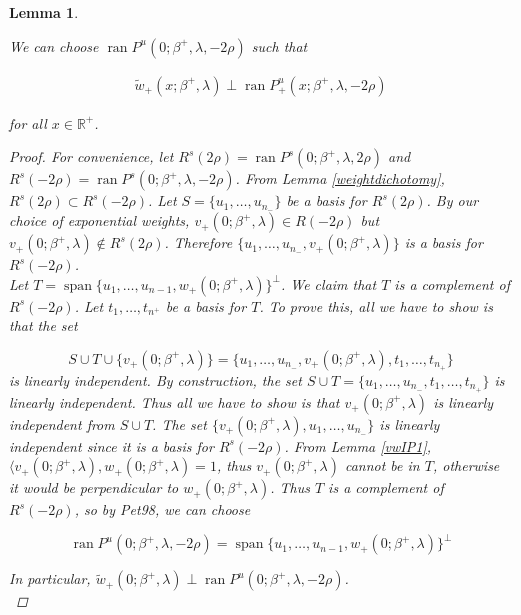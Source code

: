 \documentclass[12pt]{article}
\def\R{{\mathbb R}}
\DeclareMathOperator{\spn}{span}
\DeclareMathOperator{\ran}{ran}
\newtheorem{lemma}{Lemma}
\begin{document}
\begin{lemma}\label{wperpunstable}

We can choose $\ran P^u(0; \beta^+, \lambda, -2 \rho)$ such that 

\begin{align*}
\tilde{w}_+(x; \beta^+, \lambda) \perp \ran P^u_+(x; \beta^+, \lambda, -2 \rho) 
\end{align*}

for all $x \in \R^+$.

\begin{proof}

For convenience, let $R^s(2 \rho) = \ran P^s(0; \beta^+, \lambda, 2 \rho)$ and $R^s(-2 \rho) = \ran P^s(0; \beta^+, \lambda, -2 \rho)$. From Lemma \ref{weightdichotomy}, $R^s(2 \rho) \subset R^s(-2 \rho)$. Let $S = \{ u_1, \dots, u_{n_-} \}$ be a basis for $R^s(2 \rho)$. By our choice of exponential weights, $v_+(0; \beta^+, \lambda) \in R(-2 \rho)$ but $v_+(0; \beta^+, \lambda) \not\in R^s(2 \rho)$. Therefore $\{ u_1, \dots, u_{n_-}, v_+(0; \beta^+, \lambda)\}$ is a basis for $R^s(-2 \rho)$.\\

Let $T = \spn\{ u_1, \dots, u_{n-1} , w_+(0; \beta^+, \lambda) \}^\perp$. We claim that $T$ is a complement of $R^s(-2 \rho)$. Let $t_1, \dots, t_{n^+}$ be a basis for $T$. To prove this, all we have to show is that the set 

\[
S \cup T \cup \{ v_+(0; \beta^+, \lambda) \} =  \{ u_1, \dots, u_{n_-} , v_+(0; \beta^+, \lambda), t_1, \dots, t_{n_+} \}
\]
is linearly independent. By construction, the set $S \cup T = \{ u_1, \dots, u_{n_-}, t_1, \dots, t_{n_+} \}$ is linearly independent. Thus all we have to show is that $v_+(0; \beta^+, \lambda)$ is linearly independent from $S \cup T$. The set $\{ v_+(0; \beta^+, \lambda), u_1, \dots, u_{n_-}\}$ is linearly independent since it is a basis for $R^s(-2 \rho)$. From Lemma \ref{vwIP1}, $\langle v_+(0; \beta^+, \lambda), w_+(0; \beta^+, \lambda) = 1$, thus $v_+(0; \beta^+, \lambda)$ cannot be in $T$, otherwise it would be perpendicular to $w_+(0; \beta^+, \lambda)$. Thus $T$ is a complement of $R^s(-2 \rho)$, so by Pet98, we can choose

\begin{equation}
\ran P^u(0; \beta^+, \lambda, -2 \rho) = \spn\{ u_1, \dots, u_{n-1} , w_+(0; \beta^+, \lambda) \}^\perp
\end{equation}

In particular, $\tilde{w}_+(0; \beta^+, \lambda) \perp \ran P^u(0; \beta^+, \lambda, -2 \rho)$.\\


\end{proof}
\end{lemma}
\end{document}
